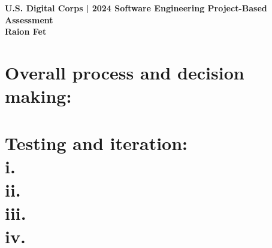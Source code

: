 \documentclass[11pt]{article}
\begin{document}
	
	\begin{center}
		\large\textbf{U.S. Digital Corps | 2024 Software Engineering Project-Based Assessment}
		\\\textbf{Raion Fet}
	\end{center}
	
	\section{Overall process and decision making:
			}
	\section{Testing and iteration:
			\\i. 
			\\\textbf{ii. }
			\\\textbf{iii. }
			\\\textbf{iv. }
			}
		
\end{document}
